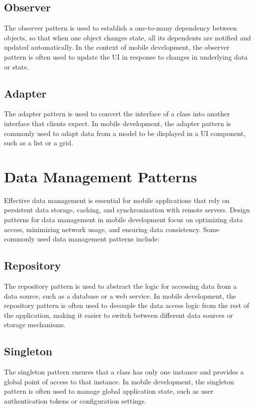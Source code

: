 \documentclass[journal]{IEEEtran}
\begin{document}
	\subsection{Observer}
	The observer pattern is used to establish a one-to-many dependency between objects, so that when one object changes state, all its dependents are notified and updated automatically. In the context of mobile development, the observer pattern is often used to update the UI in response to changes in underlying data or state.
	
	\subsection{Adapter}
	The adapter pattern is used to convert the interface of a class into another interface that clients expect. In mobile development, the adapter pattern is commonly used to adapt data from a model to be displayed in a UI component, such as a list or a grid.
	
	\section{Data Management Patterns}
	Effective data management is essential for mobile applications that rely on persistent data storage, caching, and synchronization with remote servers. Design patterns for data management in mobile development focus on optimizing data access, minimizing network usage, and ensuring data consistency. Some commonly used data management patterns include:
	
	\subsection{Repository}
	The repository pattern is used to abstract the logic for accessing data from a data source, such as a database or a web service. In mobile development, the repository pattern is often used to decouple the data access logic from the rest of the application, making it easier to switch between different data sources or storage mechanisms.
	
	\subsection{Singleton}
	The singleton pattern ensures that a class has only one instance and provides a global point of access to that instance. In mobile development, the singleton pattern is often used to manage global application state, such as user authentication tokens or configuration settings.
	
\end{document}

